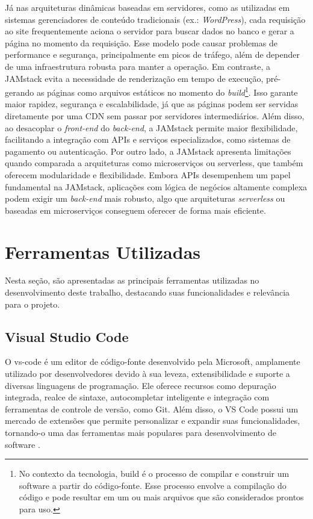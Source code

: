 {    Já nas arquiteturas dinâmicas baseadas em servidores, como as utilizadas em sistemas gerenciadores de conteúdo tradicionais (ex.: \textit{WordPress}), cada requisição ao site frequentemente aciona o servidor para buscar dados no banco e gerar a página no momento da requisição. Esse modelo pode causar problemas de performance e segurança, principalmente em picos de tráfego, além de depender de uma infraestrutura robusta para manter a operação.
    Em contraste, a JAMstack evita a necessidade de renderização em tempo de execução, pré-gerando as páginas como arquivos estáticos no momento do \textit{build}\footnote{No contexto da tecnologia, build é o processo de compilar e construir um software a partir do código-fonte. Esse processo envolve a compilação do código e pode resultar em um ou mais arquivos que são considerados prontos para uso.}. Isso garante maior rapidez, segurança e escalabilidade, já que as páginas podem ser servidas diretamente por uma CDN sem passar por servidores intermediários. Além disso, ao desacoplar o \textit{front-end} do \textit{back-end}, a JAMstack permite maior flexibilidade, facilitando a integração com APIs e serviços especializados, como sistemas de pagamento ou autenticação.
    Por outro lado, a JAMstack apresenta limitações quando comparada a arquiteturas como microserviços ou serverless, que também oferecem modularidade e flexibilidade. Embora APIs desempenhem um papel fundamental na JAMstack, aplicações com lógica de negócios altamente complexa podem exigir um \textit{back-end} mais robusto, algo que arquiteturas \textit{serverless} ou baseadas em microserviços conseguem oferecer de forma mais eficiente.
    
    \section{Ferramentas Utilizadas}
    Nesta seção, são apresentadas as principais ferramentas utilizadas no desenvolvimento deste trabalho, destacando suas funcionalidades e relevância para o projeto.
    
    \subsection{Visual Studio Code}
    O \gls{vs-code} é um editor de código-fonte desenvolvido pela Microsoft, amplamente utilizado por desenvolvedores devido à sua leveza, extensibilidade e suporte a diversas linguagens de programação. Ele oferece recursos como depuração integrada, realce de sintaxe, autocompletar inteligente e integração com ferramentas de controle de versão, como Git. Além disso, o VS Code possui um mercado de extensões que permite personalizar e expandir suas funcionalidades, tornando-o uma das ferramentas mais populares para desenvolvimento de software \citep{vscode}.
    
}
